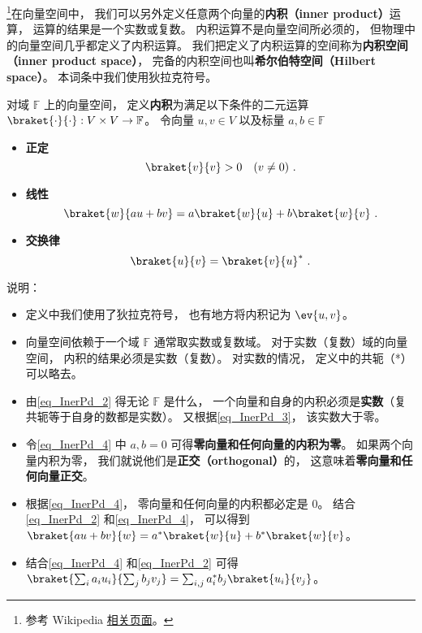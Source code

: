 


\footnote{参考 Wikipedia \href{https://en.wikipedia.org/wiki/Inner_product_space}{相关页面}。}在向量空间中， 我们可以另外定义任意两个向量的\textbf{内积（inner product）}运算， 运算的结果是一个实数或复数。 内积运算不是向量空间所必须的， 但物理中的向量空间几乎都定义了内积运算。 我们把定义了内积运算的空间称为\textbf{内积空间（inner product space）}， 完备的内积空间也叫\textbf{希尔伯特空间（Hilbert space）}。 本词条中我们使用狄拉克符号。

\begin{definition}{}
对域 $\mathbb F$ 上的向量空间， 定义\textbf{内积}为满足以下条件的二元运算 $\braket{\cdot}{\cdot}: V\times V\to \mathbb F$。 令向量 $u, v\in V$ 以及标量 $a, b \in \mathbb F$
\begin{itemize}
\item \textbf{正定}
\begin{equation}\label{eq_InerPd_3}
\braket{v}{v} > 0 \quad (v \ne 0)~.
\end{equation}
\item \textbf{线性}
\begin{equation}\label{eq_InerPd_4}
\braket{w}{a u + b v} = a\braket{w}{u} + b\braket{w}{v}~.
\end{equation}
\item \textbf{交换律}
\begin{equation}\label{eq_InerPd_2}
\braket{u}{v} = \braket{v}{u}^*~.
\end{equation}
\end{itemize}
\end{definition}
说明：
\begin{itemize}
\item 定义中我们使用了狄拉克符号， 也有地方将内积记为 $\ev{u, v}$。
\item 向量空间依赖于一个域 $\mathbb F$ 通常取实数或复数域。 对于实数（复数）域的向量空间， 内积的结果必须是实数（复数）。 对实数的情况， 定义中的共轭（*）可以略去。
\item 由\autoref{eq_InerPd_2}  得无论 $\mathbb F$ 是什么， 一个向量和自身的内积必须是\textbf{实数}（复共轭等于自身的数都是实数）。 又根据\autoref{eq_InerPd_3}， 该实数大于零。
\item 令\autoref{eq_InerPd_4} 中 $a,b= 0$ 可得\textbf{零向量和任何向量的内积为零}。 如果两个向量内积为零， 我们就说他们是\textbf{正交（orthogonal）}的， 这意味着\textbf{零向量和任何向量正交}。
\item 根据\autoref{eq_InerPd_4}， 零向量和任何向量的内积都必定是 0。 结合\autoref{eq_InerPd_2} 和\autoref{eq_InerPd_4}， 可以得到 $\braket{a u + b v}{w} = a^*\braket{w}{u} + b^*\braket{w}{v}$。
\item 结合\autoref{eq_InerPd_4} 和\autoref{eq_InerPd_2} 可得 $\braket{\sum_i a_i u_i}{\sum_j b_j v_j} = \sum_{i,j} a_i^* b_j \braket{u_i}{v_j}$。
\end{itemize}


